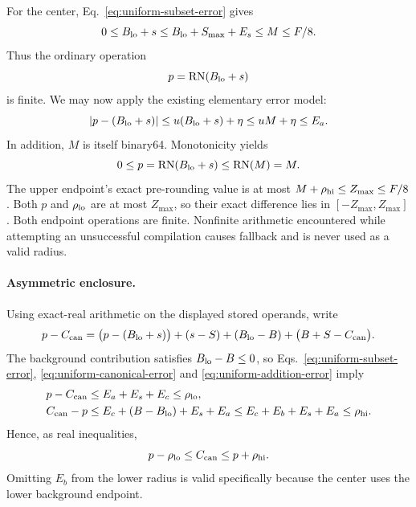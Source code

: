 \documentclass[11pt]{article}
\begin{document}
For the center, Eq.~\eqref{eq:uniform-subset-error} gives
\begin{equation}
0\le B_{\rm lo}+s\le B_{\rm lo}+S_{\max}+E_s\le M\le F/8.
\end{equation}
Thus the ordinary operation
\begin{equation}
p=\operatorname{RN}(B_{\rm lo}+s)
\label{eq:uniform-center}
\end{equation}
is finite. We may now apply the existing elementary error model:
\begin{equation}
|p-(B_{\rm lo}+s)|
\le u(B_{\rm lo}+s)+\eta
\le uM+\eta
\le E_a.
\label{eq:uniform-addition-error}
\end{equation}
In addition, $M$ is itself binary64. Monotonicity yields
\begin{equation}
0\le p=\operatorname{RN}(B_{\rm lo}+s)\le\operatorname{RN}(M)=M.
\label{eq:uniform-point-max}
\end{equation}
The upper endpoint's exact pre-rounding value is at most $M+\rho_{\rm hi}\le Z_{\max}\le F/8$. Both $p$ and $\rho_{\rm lo}$ are at most $Z_{\max}$, so their exact difference lies in $[-Z_{\max},Z_{\max}]$. Both endpoint operations are finite. Nonfinite arithmetic encountered while attempting an unsuccessful compilation causes fallback and is never used as a valid radius.

\paragraph{Asymmetric enclosure.}
Using exact-real arithmetic on the displayed stored operands, write
\begin{equation}
p-C_{\rm can}
=\bigl(p-(B_{\rm lo}+s)\bigr)+(s-S)+(B_{\rm lo}-B)
 +\bigl(B+S-C_{\rm can}\bigr).
\label{eq:uniform-error-decomposition}
\end{equation}
The background contribution satisfies $B_{\rm lo}-B\le0$, so Eqs.~\eqref{eq:uniform-subset-error}, \eqref{eq:uniform-canonical-error} and \eqref{eq:uniform-addition-error} imply
\begin{align}
p-C_{\rm can}&\le E_a+E_s+E_c\le\rho_{\rm lo},\\
C_{\rm can}-p&\le E_c+(B-B_{\rm lo})+E_s+E_a
 \le E_c+E_b+E_s+E_a\le\rho_{\rm hi}.
\label{eq:uniform-asymmetric}
\end{align}
Hence, as real inequalities,
\begin{equation}
p-\rho_{\rm lo}\le C_{\rm can}\le p+\rho_{\rm hi}.
\label{eq:uniform-real-interval}
\end{equation}
Omitting $E_b$ from the lower radius is valid specifically because the center uses the lower background endpoint.
\end{document}
